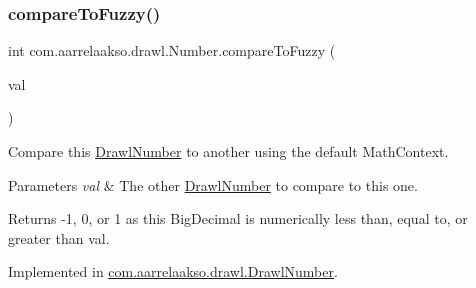 \mbox{\label{interfacecom_1_1aarrelaakso_1_1drawl_1_1_number_abe6993852fed7bc6f13dbda74b78dde3}} 
\subsubsection{\texorpdfstring{compare\+To\+Fuzzy()}{compareToFuzzy()}\hspace{0.1cm}{\footnotesize\ttfamily [1/2]}}
{\footnotesize\ttfamily int com.\+aarrelaakso.\+drawl.\+Number.\+compare\+To\+Fuzzy (\begin{DoxyParamCaption}\item[{@Not\+Null final \hyperlink{interfacecom_1_1aarrelaakso_1_1drawl_1_1_number}{Number}}]{val }\end{DoxyParamCaption})}



Compare this \hyperlink{classcom_1_1aarrelaakso_1_1drawl_1_1_drawl_number}{Drawl\+Number} to another using the default Math\+Context. 


\begin{DoxyParams}{Parameters}
{\em val} & The other \hyperlink{classcom_1_1aarrelaakso_1_1drawl_1_1_drawl_number}{Drawl\+Number} to compare to this one. \\
\hline
\end{DoxyParams}
\begin{DoxyReturn}{Returns}
-\/1, 0, or 1 as this Big\+Decimal is numerically less than, equal to, or greater than val. 
\end{DoxyReturn}


Implemented in \hyperlink{classcom_1_1aarrelaakso_1_1drawl_1_1_drawl_number_ab2624aa98592bb5dd20990c7f5921024}{com.\+aarrelaakso.\+drawl.\+Drawl\+Number}.

\mbox{\label{interfacecom_1_1aarrelaakso_1_1drawl_1_1_number_afb73cae0a12c1d25e450be6270eecfb1}} 

